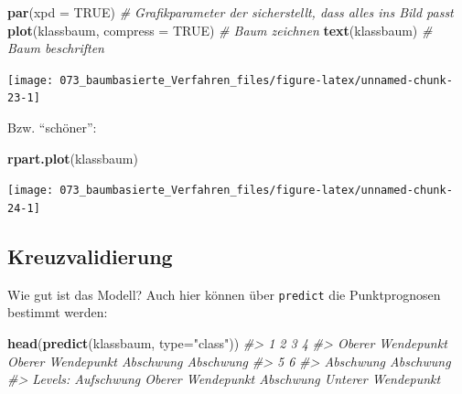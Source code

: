 \documentclass[12pt,]{book}
\newenvironment{Shaded}{\begin{snugshade}}{\end{snugshade}}
\newcommand{\KeywordTok}[1]{\textcolor[rgb]{0.13,0.29,0.53}{\textbf{{#1}}}}
\newcommand{\DataTypeTok}[1]{\textcolor[rgb]{0.13,0.29,0.53}{{#1}}}
\newcommand{\StringTok}[1]{\textcolor[rgb]{0.31,0.60,0.02}{{#1}}}
\newcommand{\CommentTok}[1]{\textcolor[rgb]{0.56,0.35,0.01}{\textit{{#1}}}}
\newcommand{\OtherTok}[1]{\textcolor[rgb]{0.56,0.35,0.01}{{#1}}}
\newcommand{\NormalTok}[1]{{#1}}
\begin{document}
\begin{Shaded}
\begin{Highlighting}[]
\KeywordTok{par}\NormalTok{(}\DataTypeTok{xpd =} \OtherTok{TRUE}\NormalTok{) }\CommentTok{# Grafikparameter der sicherstellt, dass alles ins Bild passt}
\KeywordTok{plot}\NormalTok{(klassbaum, }\DataTypeTok{compress =} \OtherTok{TRUE}\NormalTok{) }\CommentTok{# Baum zeichnen}
\KeywordTok{text}\NormalTok{(klassbaum) }\CommentTok{# Baum beschriften}
\end{Highlighting}
\end{Shaded}

\begin{center}\texttt{[image: 073\_baumbasierte\_Verfahren\_files/figure-latex/unnamed-chunk-23-1]} \end{center}

Bzw. ``schöner'':

\begin{Shaded}
\begin{Highlighting}[]
\KeywordTok{rpart.plot}\NormalTok{(klassbaum)}
\end{Highlighting}
\end{Shaded}

\begin{center}\texttt{[image: 073\_baumbasierte\_Verfahren\_files/figure-latex/unnamed-chunk-24-1]} \end{center}

\subsection{Kreuzvalidierung}\label{kreuzvalidierung-1}

Wie gut ist das Modell? Auch hier können über \texttt{predict} die
Punktprognosen bestimmt werden:

\begin{Shaded}
\begin{Highlighting}[]
\KeywordTok{head}\NormalTok{(}\KeywordTok{predict}\NormalTok{(klassbaum, }\DataTypeTok{type=}\StringTok{"class"}\NormalTok{))}
\CommentTok{#>                 1                 2                 3                 4 }
\CommentTok{#> Oberer Wendepunkt Oberer Wendepunkt         Abschwung         Abschwung }
\CommentTok{#>                 5                 6 }
\CommentTok{#>         Abschwung         Abschwung }
\CommentTok{#> Levels: Aufschwung Oberer Wendepunkt Abschwung Unterer Wendepunkt}
\end{Highlighting}
\end{Shaded}
\end{document}
